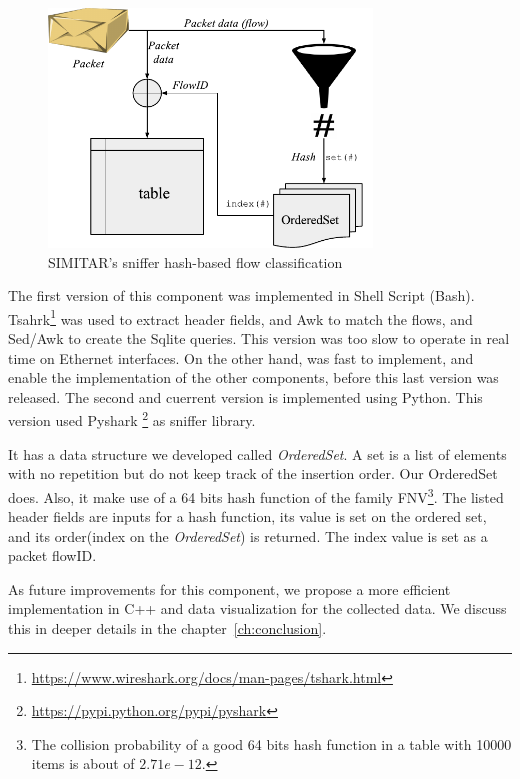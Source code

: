 \begin{figure}[ht!]
        \centering
        \includegraphics[height=2.5in]{figures/ch3/sniffer-classifier}
        \caption{SIMITAR's sniffer hash-based flow classification}
    \label{fig:sniffer}
\end{figure}


The first version of this component was implemented in Shell Script (Bash).  Tsahrk\footnote{\href{https://www.wireshark.org/docs/man-pages/tshark.html}{https://www.wireshark.org/docs/man-pages/tshark.html}} was used to extract header fields, and Awk to match the flows, and Sed/Awk to create the Sqlite queries. This version was too slow to operate in real time on Ethernet interfaces. On the other hand, was fast to implement, and enable the implementation of the other components, before this last version was released. The second and cuerrent version is implemented using Python. This version used Pyshark \footnote{\href{https://pypi.python.org/pypi/pyshark}{https://pypi.python.org/pypi/pyshark}} as sniffer library.  


It has a data structure we developed called \textit{OrderedSet}. A set is a list of elements with no repetition but do not keep track of the insertion order. Our OrderedSet does. Also, it make use of a  64 bits hash function of the family FNV\footnote{The collision probability of a good 64 bits hash function in a table with 10000 items is about of $2.71e-12$.}. The listed header fields are inputs for a hash function, its value is set on the ordered set, and its order(index on the \textit{OrderedSet}) is returned. The index value is set as a packet flowID.  

As future improvements for this component, we propose a more efficient implementation in C++ and data visualization for the collected data. We discuss this in deeper details in the chapter~\ref{ch:conclusion}.




